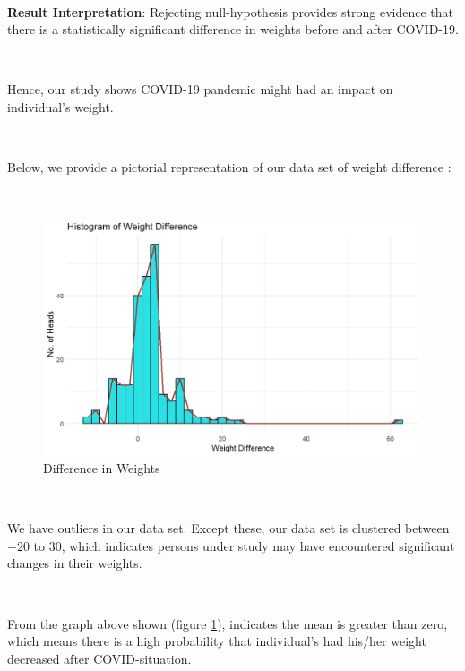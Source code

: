 \ 

\textbf{Result Interpretation}: Rejecting null-hypothesis provides strong evidence that there is a statistically significant difference in weights before and after COVID-19.

\ 

Hence, our study shows COVID-19 pandemic might had an impact on individual's weight.

\ 

Below, we provide a pictorial representation of our data set of weight difference :

\ 

\begin{figure}[h!]
	\centering
	\includegraphics[width=0.7\linewidth]{IMAGES/Image 39.jpg}
	\caption{Difference in Weights}
	\label{G39}
\end{figure}

\ 

We have outliers in our data set. Except these, our data set is clustered between $-20$ to $30$, which indicates persons under study may have encountered significant changes in their weights.

\ 

From the graph above shown (figure \ref{G39}), indicates the mean is greater than zero, which means there is a high probability that individual's had his/her weight decreased after COVID-situation.
